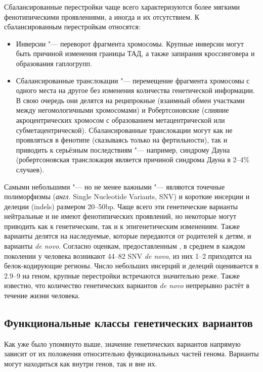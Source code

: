 \documentclass[a4paper,12pt]{article}
\begin{document}
Сбалансированные перестройки чаще всего характеризуются более мягкими фенотипическими проявлениями, а иногда и их отсутствием.
К сбалансированным перестройкам относятся:

\begin{itemize}
\item Инверсии "--- переворот фрагмента хромосомы.
Крупные инверсии могут быть причиной изменения границы ТАД, а также запирания кроссинговера и образования гаплогрупп.
\item Сбалансированные транслокации "--- перемещение фрагмента хромосомы с одного места на другое без изменения количества генетической информации.
В свою очередь они делятся на реципрокные (взаимный обмен участками между негомологичными хромосомами) и Робертсоновские (слияние акроцентрических хромосом с образованием метацентрической или субметацентрической).
Сбалансированные транслокации могут как не проявляться в фенотипе (сказываясь только на фертильности\cite{Dong_2012}), так и приводить к серьёзным последствиям "--- например, синдрому Дауна (робертсоновская транслокация является причиной синдрома Дауна в 2--4\% случаев\cite{Asim_2015}).
\end{itemize}

Самыми небольшими "--- но не менее важными "--- являются точечные полиморфизмы (\textit{англ.} Single Nucleotide Variants, SNV) и короткие инсерции и делеции (indels) размером 20--50bp.
Чаще всего эти генетические варианты нейтральные и не имеют фенотипических проявлений, но некоторые могут приводить как к генетическим, так и к эпигенетическим изменениям.
Также варианты делятся на наследуемые, которые передаются от родителей к детям, и варианты \textit{de novo}.
Согласно оценкам, предоставленным \cite{Acuna_Hidalgo_2016}, в среднем в каждом поколении у человека возникают 44--82 SNV \textit{de novo}, из них 1--2 приходятся на белок-кодирующие регионы.
Число небольших инсерций и делеций оценивается в 2.9--9 на геном, крупные перестройки встречаются значительно реже.
Также известно, что количество генетических вариантов \textit{de novo} непрерывно растёт в течение жизни человека.

\subsection{Функциональные классы генетических вариантов}

Как уже было упомянуто выше, значение генетических вариантов напрямую зависит от их положения относительно функциональных частей генома.
Варианты могут находиться как внутри генов, так и вне их.
\end{document}
